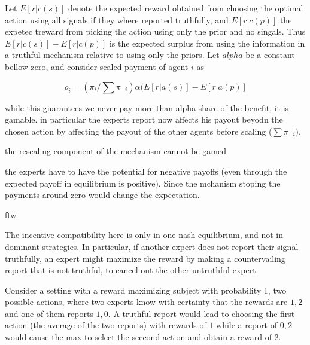 \begin{eg}

Let $E[r|c(s)]$ denote the expected reward obtained from choosing the optimal action using all signals if they where reported truthfully, and $E[r|c(p)] $ the expetec treward from picking the action using only the prior and no singals. Thus $E[r|c(s)] - E[r|c(p)] $ is the expected surplus from using the information in a truthful mechanism relative to using only the priors. Let $alpha$ be a constant bellow zero, and consider scaled payment of agent $i$ as 

\[
  \rho_i  = ( \pi_i  / \sum \pi_{-i} )    \alpha  (E[r|a(s)] - E[r|a(p)] 
\]

while this guarantees we never pay more than alpha share of the benefit, it is gamable. in particular the experts report now affects his payout beyodn the chosen action by affecting the payout of the other agents before scaling ($\sum \pi_{-i}$).

\end{eg}




\begin{lem}
	the rescaling component of the mechanism cannot be gamed
\end{lem}





the experts have to have the potential for negative payoffs (even through the expected payoff in equilibrium is positive). Since the mchanism stoping the payments around zero would change the expectation. 





\begin{defn}
	ftw
\end{defn}

The incentive compatibility here is only in one nash equilibrium, and not in dominant strategies. In particular, if another expert does not report their signal truthfully, an expert might maximize the reward by making a countervailing report that is not truthful, to cancel out the other untruthful expert. 

\begin{eg}
	Consider a setting with a reward maximizing subject with probability 1, two possible actions, where two experts know with certainty that the rewards are $1,2$ and one of them reports $1,0$. A truthful report would lead to choosing the first action (the average of the two reports) with rewards of $1$ while a report of $0,2$ would cause the max to select the seccond action and obtain a reward of $2$.
\end{eg}

